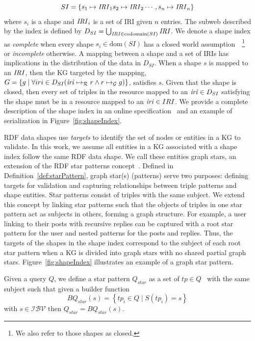 \begin{equation}\label{eq:shapeIndex}
   SI = \left\{ s_1 \mapsto \mathit{IRI}_1 s_2 \mapsto \mathit{IRI}_2 \cdots, s_n \mapsto \mathit{IRI}_n \right\}
\end{equation}
where $s_i$ is a shape and $\mathit{IRI}_i$ is a set of IRI given $n$ entries.
The subweb described by the index is defined by $D_{SI} = \bigcup_{\mathit{IRI} \in \text{codomain}(SI)} \mathit{IRI}$.
We denote a shape index as \emph{complete} when every shape $s_i \in \text{dom}(SI)$ has a closed world assumption~\cite{Gayo2018b, Gayo2018}~\footnote{We also refer to those shapes as closed.} or \emph{incomplete} otherwise.
A mapping between a shape and a set of IRIs has implications in the distribution of the data in $D_{SI}$.
When a shape $s$ is mapped to an $\mathit{IRI}$, then the KG targeted by the mapping, $G = \left\{ g \mid \forall iri \in D_{SI} (\mathit{iri} \mapsto_{\mathcal{R}} r \land r \mapsto_{\mathcal{G}} g) \right\}$, satisfies $s$.
Given that the shape is closed, then every set of triples in the resource mapped to an $\mathit{iri} \in D_{SI}$ satisfying the shape must be in a resource mapped to an $\mathit{iri} \in IRI$.
We provide a complete description of the shape index in an online specification~ and an example of serialization in Figure~\ref{fig:shapeIndex}.

RDF data shapes use \emph{targets} to identify the set of nodes or entities in a KG to validate.  
In this work, we assume all entities in a KG associated with a shape index follow the same RDF data shape.  
We call these entities graph stars, an extension of the RDF star patterns concept~\cite{Karim2020}.  
Defined in Definition~\ref{def:starPattern}, graph star(s) (patterns)  serve two purposes:
defining targets for validation and capturing relationships between triple patterns and shape entities.  
Star patterns consist of triples with the same subject.
We extend this concept by linking star patterns such that the objects of triples in one star pattern act as subjects in others, forming a graph structure.
For example, a user linking to their posts with recursive replies can be captured with a root star pattern for the user and nested patterns for the posts and replies.  
Thus, the targets of the shapes in the shape index correspond to the subject of each root star pattern when a KG is divided into graph stars with no shared partial graph stars.  
Figure~\ref{fig:shapeIndex} illustrates an example of a graph star pattern.

\begin{definition}
   Given a query $Q$, we define a star pattern $Q_{star}$ as a set of $tp \in Q$~\cite{Karim2020} with the same subject such that 
   given a builder function 
   \begin{equation}
       BQ_{star}(s) = \left\{ tp_i \in Q \mid S(tp_i) = s \right\}
   \end{equation}
   with $s \in \mathcal{I}\mathcal{B}\mathcal{V}$ then $Q_{star} = BQ_{star}(s)$.

\end{definition}

